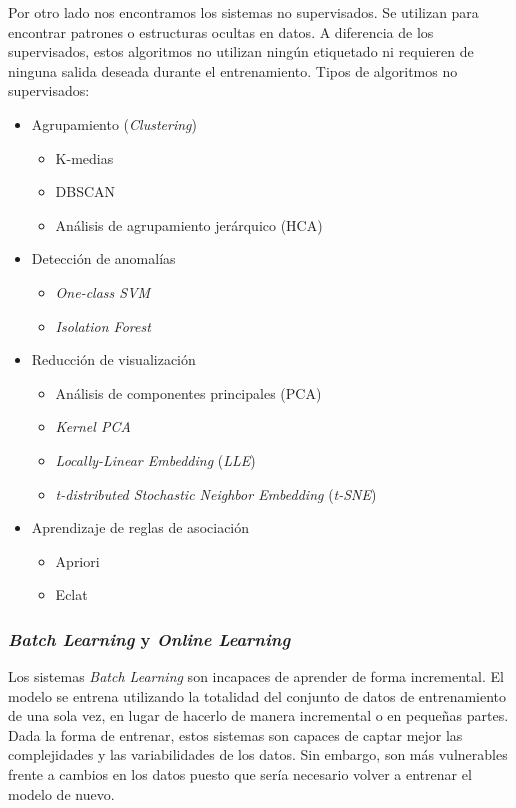 \documentclass[12pt,a4paper,Spanish]{article}
\begin{document}
Por otro lado nos encontramos los sistemas no supervisados. Se utilizan para encontrar patrones o estructuras ocultas en datos. A diferencia de los supervisados, estos algoritmos no utilizan ningún etiquetado ni requieren de ninguna salida deseada durante el entrenamiento. Tipos de algoritmos no supervisados:
\begin{itemize}
	\item Agrupamiento (\textit{Clustering})
	\begin{itemize}
		\item K-medias
		\item DBSCAN
		\item Análisis de agrupamiento jerárquico (HCA)	
	\end{itemize}
	\item Detección de anomalías
	\begin{itemize}
		\item \textit{One-class SVM}
		\item \textit{Isolation Forest}	
	\end{itemize}
	\item Reducción de visualización
	\begin{itemize}
		\item Análisis de componentes principales (PCA)
		\item \textit{Kernel PCA}	
		\item \textit{Locally-Linear Embedding} (\textit{LLE})
		\item \textit{t-distributed Stochastic Neighbor Embedding} (\textit{t-SNE})
	\end{itemize}
	\item Aprendizaje de reglas de asociación
	\begin{itemize}
		\item Apriori
		\item Eclat	
	\end{itemize}	
\end{itemize}

\subsubsection{\textit{Batch Learning} y \textit{Online Learning}}
Los sistemas \textit{Batch Learning} son incapaces de aprender de forma incremental. El modelo se entrena utilizando la totalidad del conjunto de datos de entrenamiento de una sola vez, en lugar de hacerlo de manera incremental o en pequeñas partes. Dada la forma de entrenar, estos sistemas son capaces de captar mejor las complejidades y las variabilidades de los datos. Sin embargo, son más vulnerables frente a cambios en los datos puesto que sería necesario volver a entrenar el modelo de nuevo.
\newline
\end{document}
